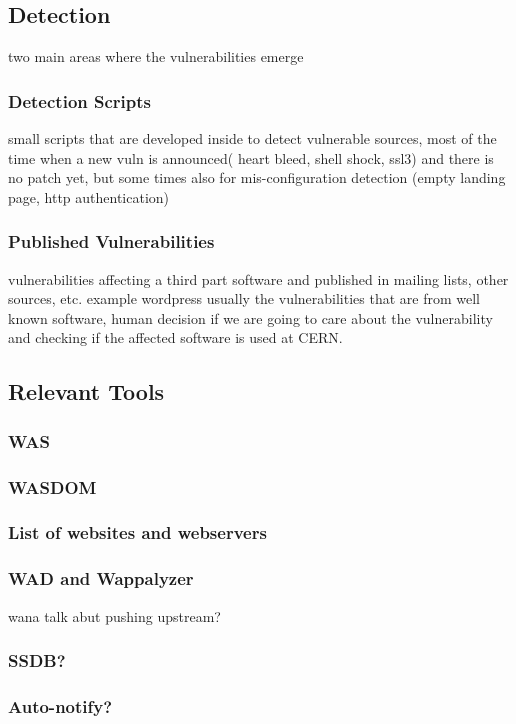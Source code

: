\subsection{Detection}
two main areas where the vulnerabilities emerge
\subsubsection{Detection Scripts}
small scripts that are developed inside to detect vulnerable sources, most of the time when a new vuln is announced( heart bleed, shell shock, ssl3) and there is no patch yet, but some times also for mis-configuration detection (empty landing page, http authentication)
\subsubsection{Published Vulnerabilities}
vulnerabilities affecting a third part software and published in mailing lists, other sources, etc. example wordpress
usually the vulnerabilities that are from well known software, human decision if we are going to care about the vulnerability and checking if the affected software is used at CERN.

\subsection{Relevant Tools}
\label{sec:tools}
\subsubsection{WAS}
\subsubsection{WASDOM}
\subsubsection{List of websites and webservers}
\subsubsection{WAD and Wappalyzer}
\label{wad_section}
wana talk abut pushing upstream?
\subsubsection{SSDB?}
\subsubsection{Auto-notify?}

